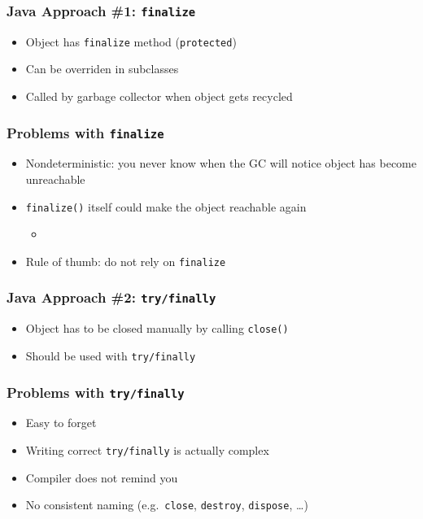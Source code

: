 \begin{frame}
  \frametitle{Java Approach \#1: {\tt finalize}}
  \begin{itemize}
    \item Object has {\tt finalize} method ({\tt protected})
    \item Can be overriden in subclasses
    \item Called by garbage collector when object gets recycled
  \end{itemize}
\end{frame}

\begin{frame}
  \frametitle{Problems with \texttt{finalize}}
  \begin{itemize}
    \item Nondeterministic: you never know when the GC will notice object has become unreachable
    \item {\tt finalize()} itself could make the object reachable again
          \begin{itemize}
            \item {}
          \end{itemize}
    \item Rule of thumb: do not rely on {\tt finalize}
  \end{itemize}
\end{frame}

\begin{frame}
  \frametitle{Java Approach \#2: {\tt try/finally}}
  \begin{itemize}
    \item Object has to be closed manually by calling {\tt close()}
    \item Should be used with {\tt try/finally}
  \end{itemize}
\end{frame}

\begin{frame}
  \frametitle{Problems with {\tt try/finally}}
  \begin{itemize}
    \item Easy to forget
    \item Writing correct \texttt{try/finally} is actually complex
    \item Compiler does not remind you
    \item No consistent naming (e.g.\ {\tt close}, {\tt destroy}, {\tt dispose}, \dots)
  \end{itemize}
\end{frame}

